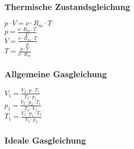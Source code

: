 \subsubsection{Thermische Zustandsgleichung} 
\begin{minipage}{0.45\textwidth} 
$ p\cdot V =\nu \cdot R_{m} \cdot T $\\ 
$ p =\frac{\nu \cdot R_{m} \cdot T}{  V} $\\ 
$ V =\frac{\nu \cdot R_{m} \cdot T}{  p} $\\ 
$ T =\frac{p\cdot V}{\nu \cdot R_{m} } $\\ 
\end{minipage} 
\begin{minipage}{0.45\textwidth} 
 
\end{minipage} 
\subsubsection{Allgemeine Gasgleichung} 
\begin{minipage}{0.45\textwidth} 
$ V_{1}  = \frac{V_{2} \cdot p_{} \cdot T_{1} }{  T_{2} \cdot p_{1} } $\\ 
$ p_{1}  = \frac{V_{2} \cdot p_{2} \cdot T_{1} }{  T_{2} \cdot V_{1} } $\\ 
$ T_{1}  = \frac{V_{1} \cdot p_{1} \cdot T_{2} }{  V_{2} \cdot p_{2} } $\\ 
\end{minipage} 
\begin{minipage}{0.45\textwidth} 
 
\end{minipage} 

\subsubsection{Ideale Gasgleichung}
\begin{minipage}{0.45\textwidth}

 \\
\end{minipage}
\begin{minipage}{0.45\textwidth}


\end{minipage} 

